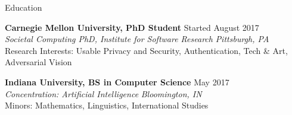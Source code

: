 \documentclass{resume} %
\begin{document}

\begin{rSection}{Education}

{\bf Carnegie Mellon University, PhD Student} \hfill Started August 2017 \\ 
\textit{Societal Computing PhD, Institute for Software Research} \hfill {\em Pittsburgh, PA}\\
Research Interests: Usable Privacy and Security, Authentication, Tech \& Art, Adversarial Vision

{\bf Indiana University, BS in Computer Science} \hfill May 2017 \\ 
\textit{Concentration: Artificial Intelligence} \hfill {\em Bloomington, IN}\\
Minors: Mathematics, Linguistics, International Studies

\end{rSection}
\end{document}
